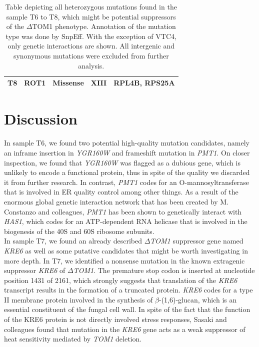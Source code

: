 \documentclass[10pt,a4paper]{article}
\begin{document}
\begin{table}[]
{\begin{tabular}{|l|l|l|l|l|}
			\textbf{T8} & ROT1 & Missense & XIII & RPL4B, RPS25A \\ \hline
		\end{tabular}%
	}
\caption{\small Table depicting all heterozygous mutations found in the sample T6 to T8, which might be potential suppressors of the $\Delta$TOM1 phenotype.  Annotation of the mutation type was done by SnpEff. With the exception of VTC4, only genetic interactions are shown. All intergenic and synonymous mutations were excluded from further analysis.}
\label{tab:mutationT68}	
\end{table}

\section*{\large Discussion}

In sample T6, we found two potential high-quality mutation candidates, namely an inframe insertion in \textit{YGR160W} and frameshift mutation in \textit{PMT1}. On closer inspection, we found that \textit{YGR160W} was flagged as a dubious gene, which is unlikely to encode a functional protein, thus in spite of the quality we discarded it from further research. In contrast, \textit{PMT1} codes for an O-mannosyltransferase that is involved in ER quality control among other things\cite{strahl_pmti_1993,goder_protein_2011}. As a result of the enormous global genetic interaction network that has been created by M. Constanzo and colleagues, \textit{PMT1} has been shown to genetically interact with \textit{HAS1}, which codes for an ATP-dependent RNA helicase that is involved in the biogenesis of the 40S and 60S ribosome subunits\cite{costanzo_global_2016,dembowski_has1_2013}.\\ 

\noindent In sample T7, we found an already described\textit{ $\Delta$TOM1} suppressor gene named \textit{KRE6} as well as some putative candidates that might be worth investigating in more depth. In T7, we identified a nonsense mutation in the known extragenic suppressor \textit{KRE6} of \textit{$\Delta$TOM1}. The premature stop codon is inserted at nucleotide position 1431 of 2161, which strongly suggests that translation of the \textit{KRE6} transcript results in the formation of a truncated protein. \textit{KRE6} codes for a type II membrane protein involved in the synthesis of $\beta$-(1,6)-glucan, which is an essential constituent of the fungal cell wall\cite{kurita_kre6_2011,roemer_skn1_1993}. In spite of the fact that the function of the KRE6 protein is not directly involved stress responses, Sasaki and colleagues found that mutation in the \textit{KRE6} gene acts as a weak suppressor of heat sensitivity mediated by \textit{TOM1} deletion\cite{sasaki_extragenic_2000}.\\
\end{document}
